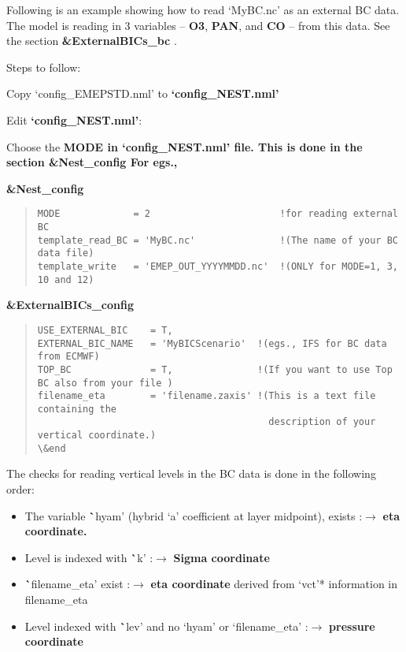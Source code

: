 Following is an example showing how to read `MyBC.nc' as an external BC data.  
The model is reading in 3 variables – {\bf O3}, {\bf PAN}, and {\bf CO} – from this data.  See the 	section {\bf \&ExternalBICs\_bc} . 

Steps to follow: 

	Copy `config\_EMEPSTD.nml' to {\bf `config\_NEST.nml'} 

	Edit {\bf `config\_NEST.nml'}:	

	Choose the \bf MODE in {\bf `config\_NEST.nml'} file. This is done in the section \bf {\&Nest\_config}
For egs.,

\bf {\&Nest\_config}
\begin{quote}
\begin{verbatim}
MODE		     = 2			           !for reading external BC 
template_read_BC = 'MyBC.nc'   		       !(The name of your BC data file)
template_write   = 'EMEP_OUT_YYYYMMDD.nc'  !(ONLY for MODE=1, 3, 10 and 12)
\end{verbatim}
\end{quote}


\bf {\&ExternalBICs\_config}
\begin{quote}
\begin{verbatim}
USE_EXTERNAL_BIC 	= T,
EXTERNAL_BIC_NAME 	= 'MyBICScenario'  !(egs., IFS for BC data from ECMWF) 
TOP_BC 		    	= T,   		       !(If you want to use Top BC also from your file )
filename_eta		= 'filename.zaxis' !(This is a text file containing the 
                                         description of your vertical coordinate.)			
\&end
\end{verbatim}
\end{quote}


The checks for reading vertical levels in the BC data is done in the following order:
\begin{itemize}
\item The variable {\textbf `hyam'} (hybrid `a' coefficient at layer midpoint), exists :${\rightarrow}$ \bf eta coordinate. 
\item Level is indexed with {\textbf `k'}  :${\rightarrow}$ \bf Sigma coordinate
\item {\textbf `filename\_eta'} exist :${\rightarrow}$ {\bf eta coordinate} derived from `vct'*  information in filename\_eta
\item Level indexed with {\textbf`lev'} and no `hyam' or `filename\_eta' :${\rightarrow}$ {\bf pressure coordinate}	
\end{itemize}


